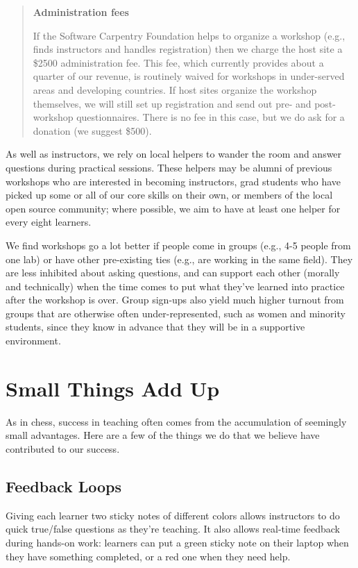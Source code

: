 \documentclass[10pt,a4paper,twocolumn]{article}
\begin{document}
\begin{quote}
\textbf{Administration fees}

If the Software Carpentry Foundation helps to organize a workshop
(e.g., finds instructors and handles registration) then we charge the
host site a \$2500 administration fee.  This fee, which currently
provides about a quarter of our revenue, is routinely waived for
workshops in under-served areas and developing countries.  If host
sites organize the workshop themselves, we will still set up
registration and send out pre- and post-workshop questionnaires.
There is no fee in this case, but we do ask for a donation (we suggest
\$500).

\end{quote}

As well as instructors, we rely on local helpers to wander the room
and answer questions during practical sessions. These helpers may be
alumni of previous workshops who are interested in becoming
instructors, grad students who have picked up some or all of our core
skills on their own, or members of the local open source community;
where possible, we aim to have at least one helper for every eight
learners.

We find workshops go a lot better if people come in groups (e.g., 4-5
people from one lab) or have other pre-existing ties (e.g., are
working in the same field). They are less inhibited about asking
questions, and can support each other (morally and technically) when
the time comes to put what they've learned into practice after the
workshop is over. Group sign-ups also yield much higher turnout from
groups that are otherwise often under-represented, such as women and
minority students, since they know in advance that they will be in a
supportive environment.

\section{Small Things Add Up}

As in chess, success in teaching often comes from the accumulation of
seemingly small advantages. Here are a few of the things we do that we
believe have contributed to our success.

\subsection{Feedback Loops}\label{s:feedback}

Giving each learner two sticky notes of different colors allows
instructors to do quick true/false questions as they're teaching. It
also allows real-time feedback during hands-on work: learners can put
a green sticky note on their laptop when they have something
completed, or a red one when they need help.
\end{document}
